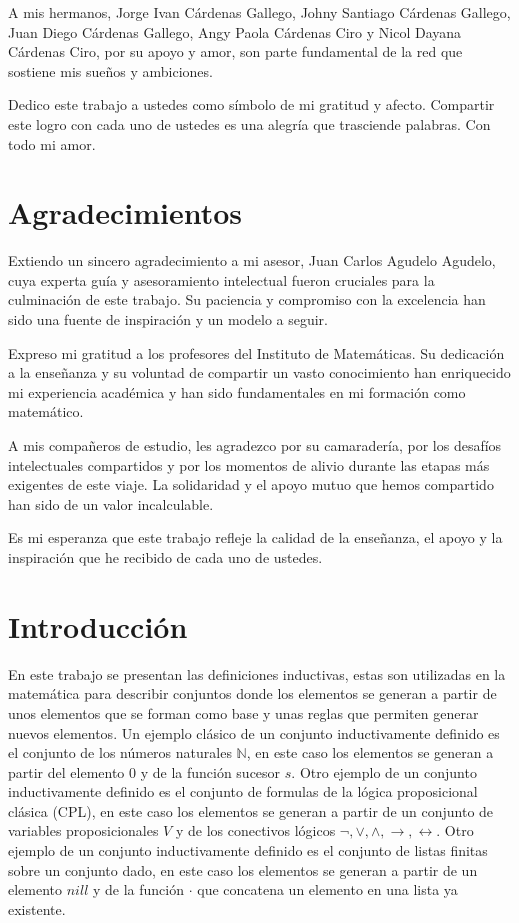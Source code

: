 \documentclass[11pt,oneside]{report}
\theoremstyle{plain}
\theoremstyle{definition}
\newcommand{\N}{\mathbb{N}}
\begin{document}
A mis hermanos, Jorge Ivan Cárdenas Gallego, Johny Santiago Cárdenas Gallego, Juan Diego Cárdenas Gallego, Angy Paola Cárdenas Ciro y Nicol Dayana Cárdenas Ciro, por su apoyo y amor, son parte fundamental de la red que sostiene mis sueños y ambiciones.

Dedico este trabajo a ustedes como símbolo de mi gratitud y afecto. Compartir este logro con cada uno de ustedes es una alegría que trasciende palabras. Con todo mi amor.

\chapter*{Agradecimientos}

Extiendo un sincero agradecimiento a mi asesor, Juan Carlos Agudelo Agudelo, cuya experta guía y asesoramiento intelectual fueron cruciales para la culminación de este trabajo. Su paciencia y compromiso con la excelencia han sido una fuente de inspiración y un modelo a seguir.

Expreso mi gratitud a los profesores del Instituto de Matemáticas. Su dedicación a la enseñanza y su voluntad de compartir un vasto conocimiento han enriquecido mi experiencia académica y han sido fundamentales en mi formación como matemático.

A mis compañeros de estudio, les agradezco por su camaradería, por los desafíos intelectuales compartidos y por los momentos de alivio durante las etapas más exigentes de este viaje. La solidaridad y el apoyo mutuo que hemos compartido han sido de un valor incalculable.

Es mi esperanza que este trabajo refleje la calidad de la enseñanza, el apoyo y la inspiración que he recibido de cada uno de ustedes.

\tableofcontents
\chapter*{Introducción}
En este trabajo se presentan las definiciones inductivas, estas son utilizadas en la matemática para describir conjuntos donde los elementos se generan a partir de unos elementos que se forman como base y unas reglas que permiten generar nuevos elementos. Un ejemplo clásico de un conjunto inductivamente definido es el conjunto de los números naturales $\N$, en este caso los elementos se generan a partir del elemento $0$ y de la función sucesor $s$. Otro ejemplo de un conjunto inductivamente definido es el conjunto de formulas de la lógica proposicional clásica (CPL), en este caso los elementos se generan a partir de un conjunto de variables proposicionales $V$ y de los conectivos lógicos $\neg, \lor, \land, \rightarrow, \leftrightarrow$. Otro ejemplo de un conjunto inductivamente definido es el conjunto de listas finitas sobre un conjunto dado, en este caso los elementos se generan a partir de un elemento $nill$ y de la función $\cdot$ que concatena un elemento en una lista ya existente.
\end{document}
